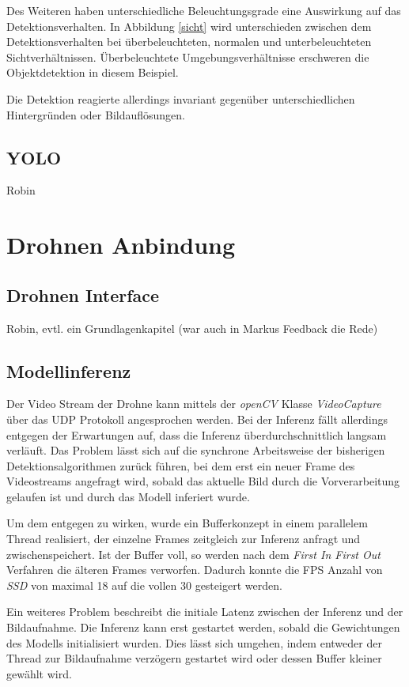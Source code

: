 Des Weiteren haben unterschiedliche Beleuchtungsgrade eine Auswirkung auf das Detektionsverhalten. In Abbildung \ref{sicht} wird unterschieden zwischen dem Detektionsverhalten bei überbeleuchteten, normalen und unterbeleuchteten Sichtverhältnissen. Überbeleuchtete Umgebungsverhältnisse erschweren die Objektdetektion in diesem Beispiel. 

Die Detektion reagierte allerdings invariant gegenüber unterschiedlichen Hintergründen oder Bildauflösungen.

\subsection*{YOLO}

Robin

\section{Drohnen Anbindung}

\subsection*{Drohnen Interface}

Robin, evtl. ein Grundlagenkapitel (war auch in Markus Feedback die Rede)

\subsection*{Modellinferenz}

Der Video Stream der Drohne kann mittels der \textit{openCV} Klasse \textit{VideoCapture} über das UDP Protokoll angesprochen werden. Bei der Inferenz fällt allerdings entgegen der Erwartungen auf, dass die Inferenz überdurchschnittlich langsam verläuft. Das Problem lässt sich auf die synchrone Arbeitsweise der bisherigen Detektionsalgorithmen zurück führen, bei dem erst ein neuer Frame des Videostreams angefragt wird, sobald das aktuelle Bild durch die Vorverarbeitung gelaufen ist und durch das Modell inferiert wurde. 

Um dem entgegen zu wirken, wurde ein Bufferkonzept in einem parallelem Thread realisiert, der einzelne Frames zeitgleich zur Inferenz anfragt und zwischenspeichert. Ist der Buffer voll, so werden nach dem \textit{First In First Out} Verfahren die älteren Frames verworfen. Dadurch konnte die FPS Anzahl von \textit{SSD} von maximal 18 auf die vollen 30 gesteigert werden. 

Ein weiteres Problem beschreibt die initiale Latenz zwischen der Inferenz und der Bildaufnahme. Die Inferenz kann erst gestartet werden, sobald die Gewichtungen des Modells initialisiert wurden. Dies lässt sich umgehen, indem entweder der Thread zur Bildaufnahme verzögern gestartet wird oder dessen Buffer kleiner gewählt wird.

